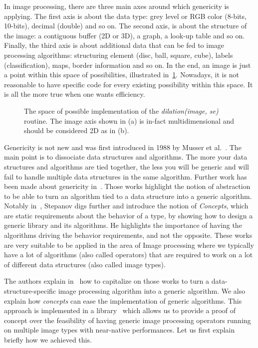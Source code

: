 In image processing, there are three main axes around which genericity is applying. The first axis is about the data type:
grey level or RGB color (8-bits, 10-bits), decimal (double) and so on. The second axis, is about the structure of the
image: a contiguous buffer (2D or 3D), a graph, a look-up table and so on. Finally, the third axis is about additional
data that can be fed to image processing algorithms: structuring element (disc, ball, square, cube), labels
(classification), maps, border information and so on. In the end, an image is just a point within this space of
possibilities, illustrated in~\ref{fig:gen.espaceSAV}. Nowadays, it is not reasonable to have specific code for every
existing possibility within this space. It is all the more true when one wants efficiency.

\begin{figure}[htbp]
  \centering
  \subfloat[]{}
  \hfil
  \subfloat[]{}
  \caption{The space of possible implementation of the \emph{dilation(image, se)} routine. The image axis shown in (a)
    is in-fact multidimensional and should be considered 2D as in (b).}
  \label{fig:gen.espaceSAV}
\end{figure}

Genericity is not new and was first introduced in 1988 by Musser et al.~\cite{musser.1988.generic}. The main point is to
dissociate data structures and algorithms. The more your data structures and algorithms are tied together, the less you
will be generic and will fail to handle multiple data structures in the same algorithm. Further work has been made about
genericity in~\cite{musser.1994.algorithm, dehnert.1998.fundamentals}. Those works highlight the notion of abstraction
to be able to turn an algorithm tied to a data structure into a generic algorithm. Notably
in~\cite{stepanov.2009.elements}, Stepanov digs further and introduce the notion of \emph{Concepts}, which are static
requirements about the behavior of a type, by showing how to design a generic library and its algorithms. He highlights
the importance of having the algorithms driving the behavior requirements, and not the opposite. These works are very
suitable to be applied in the area of Image processing where we typically have a lot of algorithms (also called
operators) that are required to work on a lot of different data structures (also called image types).

The authors explain in~\cite{roynard.2019.rrpr} how to capitalize on those works to turn a data-structure-specific image
processing algorithm into a generic algorithm. We also explain how \emph{concepts} can ease the implementation of
generic algorithms. This approach is implemented in a library~\cite{carlinet.2018.pylena} which allows us to provide a
proof of concept over the feasibility of having generic image processing operators running on multiple image types with
near-native performances. Let us first explain briefly how we achieved this.

